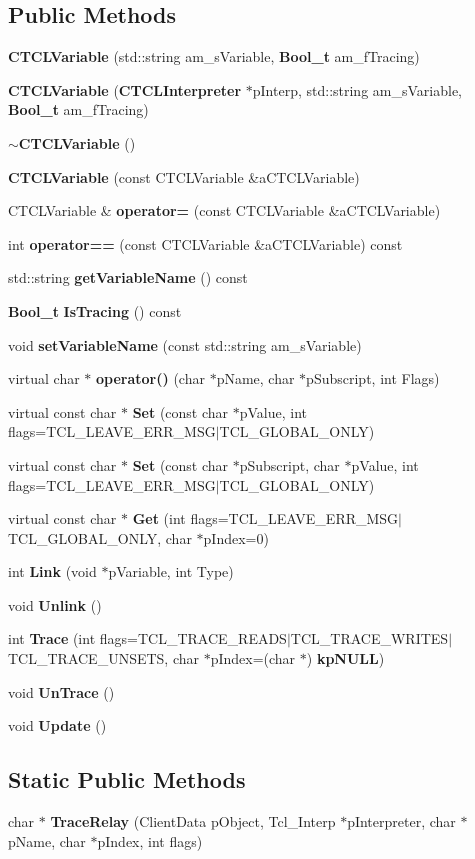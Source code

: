 \subsection*{Public Methods}
\begin{CompactItemize}
\item 
{\bf CTCLVariable} (std::string am\_\-s\-Variable, {\bf Bool\_\-t} am\_\-f\-Tracing)
\item 
{\bf CTCLVariable} ({\bf CTCLInterpreter} $\ast$p\-Interp, std::string am\_\-s\-Variable, {\bf Bool\_\-t} am\_\-f\-Tracing)
\item 
{\bf $\sim$CTCLVariable} ()
\item 
{\bf CTCLVariable} (const CTCLVariable \&a\-CTCLVariable)
\item 
CTCLVariable \& {\bf operator=} (const CTCLVariable \&a\-CTCLVariable)
\item 
int {\bf operator==} (const CTCLVariable \&a\-CTCLVariable) const
\item 
std::string {\bf get\-Variable\-Name} () const
\item 
{\bf Bool\_\-t} {\bf Is\-Tracing} () const
\item 
void {\bf set\-Variable\-Name} (const std::string am\_\-s\-Variable)
\item 
virtual char $\ast$ {\bf operator()} (char $\ast$p\-Name, char $\ast$p\-Subscript, int Flags)
\item 
virtual const char $\ast$ {\bf Set} (const char $\ast$p\-Value, int flags=TCL\_\-LEAVE\_\-ERR\_\-MSG$|$TCL\_\-GLOBAL\_\-ONLY)
\item 
virtual const char $\ast$ {\bf Set} (const char $\ast$p\-Subscript, char $\ast$p\-Value, int flags=TCL\_\-LEAVE\_\-ERR\_\-MSG$|$TCL\_\-GLOBAL\_\-ONLY)
\item 
virtual const char $\ast$ {\bf Get} (int flags=TCL\_\-LEAVE\_\-ERR\_\-MSG$|$TCL\_\-GLOBAL\_\-ONLY, char $\ast$p\-Index=0)
\item 
int {\bf Link} (void $\ast$p\-Variable, int Type)
\item 
void {\bf Unlink} ()
\item 
int {\bf Trace} (int flags=TCL\_\-TRACE\_\-READS$|$TCL\_\-TRACE\_\-WRITES$|$TCL\_\-TRACE\_\-UNSETS, char $\ast$p\-Index=(char $\ast$) {\bf kp\-NULL})
\item 
void {\bf Un\-Trace} ()
\item 
void {\bf Update} ()
\end{CompactItemize}
\subsection*{Static Public Methods}
\begin{CompactItemize}
\item 
char $\ast$ {\bf Trace\-Relay} (Client\-Data p\-Object, Tcl\_\-Interp $\ast$p\-Interpreter, char $\ast$p\-Name, char $\ast$p\-Index, int flags)
\end{CompactItemize}
